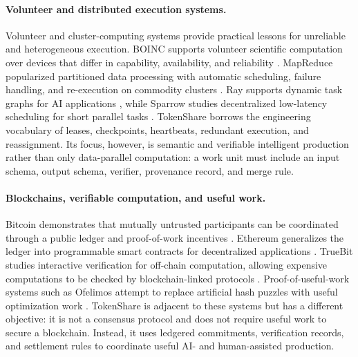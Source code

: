 \documentclass{article}
\theoremstyle{plain}
\begin{document}
\paragraph{Volunteer and distributed execution systems.}
Volunteer and cluster-computing systems provide practical lessons for unreliable and heterogeneous execution. BOINC supports volunteer scientific computation over devices that differ in capability, availability, and reliability \citep{anderson2020boinc}. MapReduce popularized partitioned data processing with automatic scheduling, failure handling, and re-execution on commodity clusters \citep{dean2004mapreduce}. Ray supports dynamic task graphs for AI applications \citep{moritz2018ray}, while Sparrow studies decentralized low-latency scheduling for short parallel tasks \citep{ousterhout2013sparrow}. TokenShare borrows the engineering vocabulary of leases, checkpoints, heartbeats, redundant execution, and reassignment. Its focus, however, is semantic and verifiable intelligent production rather than only data-parallel computation: a work unit must include an input schema, output schema, verifier, provenance record, and merge rule.

\paragraph{Blockchains, verifiable computation, and useful work.}
Bitcoin demonstrates that mutually untrusted participants can be coordinated through a public ledger and proof-of-work incentives \citep{nakamoto2008bitcoin}. Ethereum generalizes the ledger into programmable smart contracts for decentralized applications \citep{buterin2014ethereum}. TrueBit studies interactive verification for off-chain computation, allowing expensive computations to be checked by blockchain-linked protocols \citep{teutsch2019truebit}. Proof-of-useful-work systems such as Ofelimos attempt to replace artificial hash puzzles with useful optimization work \citep{fitzi2022ofelimos}. TokenShare is adjacent to these systems but has a different objective: it is not a consensus protocol and does not require useful work to secure a blockchain. Instead, it uses ledgered commitments, verification records, and settlement rules to coordinate useful AI- and human-assisted production.
\end{document}

